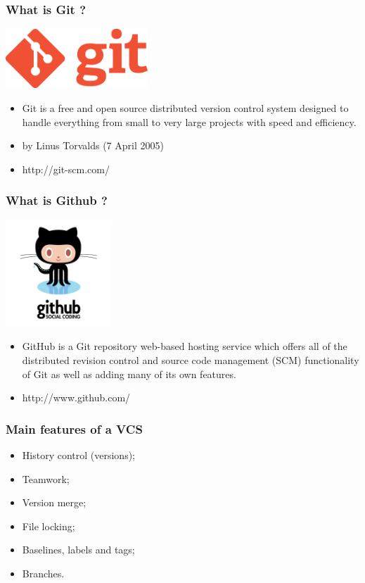 \documentclass{beamer}
\begin{document}
\begin{frame}
\frametitle{What is Git ?}
\begin{center}
  \includegraphics[width=0.4\textwidth]{imgs/git-logo.png}
\end{center}
\begin{itemize}
\item Git is a free and open source distributed version control system designed
to handle everything from small to very large projects with speed and
efficiency.
\item by Linus Torvalds (7 April 2005)
\item http://git-scm.com/
\end{itemize}
\end{frame}

\begin{frame}
\frametitle{What is Github ?}
\begin{center}
  \includegraphics[width=0.3\textwidth]{imgs/github-logo.png}
\end{center}
\begin{itemize}
\item GitHub is a Git repository web-based hosting service which offers all of
the distributed revision control and source code management (SCM) functionality
of Git as well as adding many of its own features.
\item http://www.github.com/
\end{itemize}
\end{frame}

\begin{frame}
\frametitle{Main features of a VCS}
\begin{itemize}
\item History control (versions);
\item Teamwork;
\item Version merge;
\item File locking;
\item Baselines, labels and tags;
\item Branches.
\end{itemize}
\end{frame}
\end{document}
